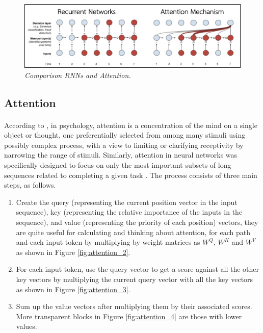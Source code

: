 \begin{figure}[H]
  \centering
  \caption[Comparison RNNs and Attention.]{\emph{Comparison RNNs and Attention.}}\label{fig:rnnvsattention}
  \includegraphics[scale = 0.4
  ]{figures/rnnvsattention.jpg}  
\end{figure}
\subsection{Attention}
\paragraph{}
According to \citeauthor{james_1890} \citeyear{james_1890}, in psychology, attention is a concentration of the mind on a single object or thought, one preferentially selected from among many stimuli using possibly complex process, with a view to limiting or clarifying receptivity by narrowing the range of stimuli. Similarly, attention in neural networks was specifically designed to focus on only the most important subsets of long sequences related to completing a given task \cite{alammar_2018,alammar_2019,klingenbrunn_2021}. The process consists of three main steps, as follows.
\begin{enumerate}
\item Create the query (representing the current position vector in the input sequence), key (representing the relative importance of the inputs in the sequence), and value (representing the priority of each position) vectors, they are quite useful for calculating and thinking about attention, for each path and each input token by multiplying by weight matrices as $W^Q$, $W^K$ and $W^V$ as shown in Figure \ref{fig:attention_2}. 
\item For each input token, use the query vector to get a score against all the other key vectors by multiplying the current query vector with all the key vectors as shown in Figure \ref{fig:attention_3}.
\item Sum up the value vectors after multiplying them by their associated scores. More transparent blocks in Figure \ref{fig:attention_4} are those with lower values.

\end{enumerate}

